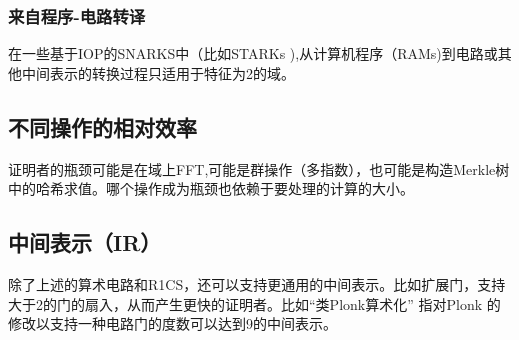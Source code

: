 \documentclass[runningheads]{llncs}
\begin{document}
\subsubsection*{来自程序-电路转译} 在一些基于IOP的SNARKS中（比如STARKs \cite{BBH19}),从计算机程序（RAMs)到电路或其他中间表示的转换过程只适用于特征为2的域。

\subsection{不同操作的相对效率} 
证明者的瓶颈可能是在域上FFT,可能是群操作（多指数），也可能是构造Merkle树中的哈希求值。哪个操作成为瓶颈也依赖于要处理的计算的大小。

\subsection{中间表示（IR）}
除了上述的算术电路和R1CS，还可以支持更通用的中间表示。比如扩展门，支持大于2的门的扇入，从而产生更快的证明者。比如“类Plonk算术化” 指对Plonk \cite{GWC19}的修改以支持一种电路门的度数可以达到9的中间表示。


\printbibliography
\end{document}
